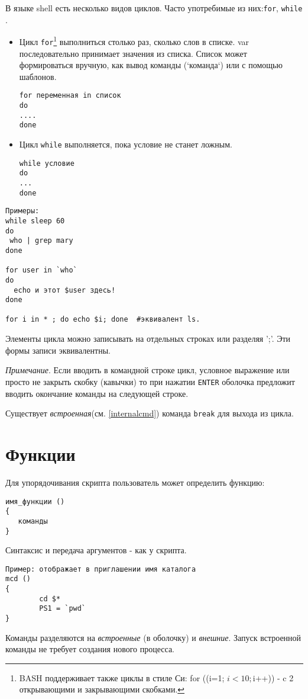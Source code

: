 В языке shell есть несколько видов циклов. Часто употребимые из них:\verb+for+, \verb+while+ .
\begin{itemize}
\item Цикл \verb+for+\footnote{BASH поддерживает также циклы в стиле Си: for ((i=1; $i<10; $i++)) - c 2 открывающими и закрывающими скобками. } выполниться столько раз, сколько слов в списке. var последовательно принимает значения из списка. Список может формироваться вручную, как вывод команды (`команда`) или с помощью шаблонов.
\begin{verbatim}
for переменная in список
do
....
done
\end{verbatim}
\item Цикл \verb+while+ выполняется, пока условие не станет ложным.
\begin{verbatim}
while условие
do
...
done
\end{verbatim}
\end{itemize}
\begin{verbatim}
Примеры:
while sleep 60
do
 who | grep mary
done

for user in `who`
do
  echo и этот $user здесь!
done

for i in * ; do echo $i; done  #эквивалент ls.
\end{verbatim}

Элементы цикла  можно записывать на отдельных строках или разделяя ';'. Эти формы записи эквивалентны.

\emph{Примечание}. Если вводить в командной строке цикл, условное выражение или просто не закрыть скобку (кавычки) то при нажатии \verb+ENTER+ оболочка предложит вводить окончание команды на следующей строке.

Существует \emph{встроенная}(см. \ref{internalcmd}) команда \verb+break+ для  выхода из цикла.

\section{Функции}

Для упорядочивания скрипта пользователь может определить функцию:
\begin{verbatim}
имя_функции ()
{
   команды
}
\end{verbatim}
Синтаксис и передача аргументов - как у скрипта.
\begin{verbatim}
Пример: отображает в приглашении имя каталога
mcd ()
{
		cd $*
		PS1 = `pwd`
}
\end{verbatim}

Команды разделяются на \emph{встроенные} (в оболочку) \label{internalcmd} и \emph{внешние}. Запуск встроенной команды не требует создания нового процесса.
 
